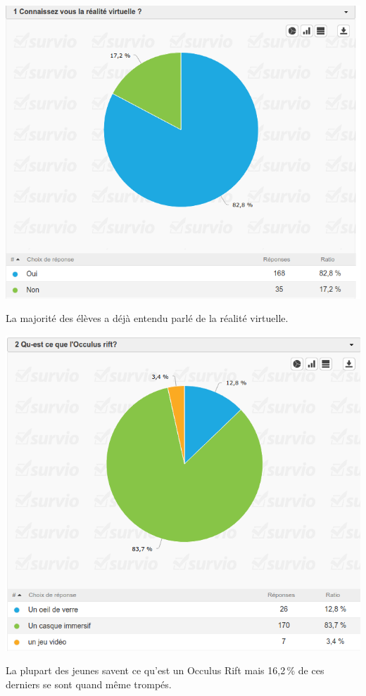 \documentclass[12pt, a4paper]{report}
\begin{document}
\begin{center}
\includegraphics[scale=0.5]{1.png}

La majorité des élèves a déjà entendu parlé de la réalité virtuelle.
\end{center}

\begin{center}
\includegraphics[scale=0.5]{2.png}

La plupart des jeunes savent ce qu'est un Occulus Rift mais 16,2\,\% de ces derniers se sont quand même trompés.
\end{center}
\end{document}
